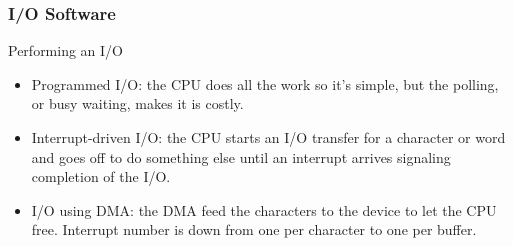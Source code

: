 \begin{frame}
  \frametitle{I/O Software}
  \begin{block}{Performing an I/O}
    \begin{itemize}
      \item Programmed I/O: the CPU does all the work so it's simple, but the polling, or busy waiting, makes it is costly.
      \item Interrupt-driven I/O: the CPU starts an I/O transfer for a character or word and goes off to do something else until an interrupt arrives signaling completion of the I/O.
      \item I/O using DMA: the DMA feed the characters to the device to let the CPU free. Interrupt number is down from one per character to one per buffer.
    \end{itemize}
  \end{block}
\end{frame}
